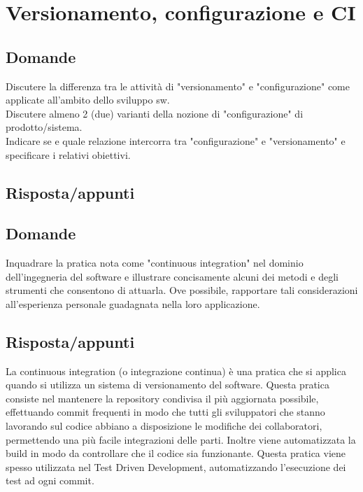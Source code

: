 \section{Versionamento, configurazione e CI}

\subsection*{Domande}
Discutere la differenza tra le attività di "versionamento" e "configurazione" come applicate all'ambito dello sviluppo sw.\\

Discutere almeno 2 (due) varianti della nozione di "configurazione" di prodotto/sistema. \\

Indicare se e quale relazione intercorra tra "configurazione" e "versionamento" e specificare i relativi obiettivi.

\subsection*{Risposta/appunti}



\subsection*{Domande} %
Inquadrare la pratica nota come "continuous integration" nel dominio dell'ingegneria del software e illustrare concisamente alcuni dei metodi e degli strumenti che consentono di attuarla. Ove possibile, rapportare tali considerazioni all'esperienza personale guadagnata nella loro applicazione.

\subsection*{Risposta/appunti} %
La continuous integration (o integrazione continua) è una pratica che si applica quando si utilizza un sistema di versionamento del software. Questa pratica consiste nel mantenere la repository condivisa il più aggiornata possibile, effettuando commit frequenti in modo che tutti gli sviluppatori che stanno lavorando sul codice abbiano a disposizione le modifiche dei collaboratori, permettendo una più facile integrazioni delle parti. Inoltre viene automatizzata la build in modo da controllare che il codice sia funzionante. Questa pratica viene spesso utilizzata nel Test Driven Development, automatizzando l'esecuzione dei test ad ogni commit.

